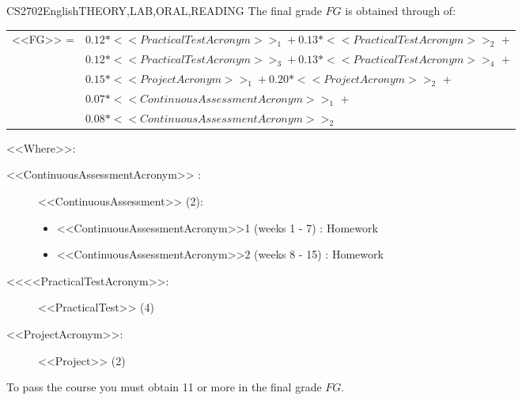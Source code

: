     
    \begin{evaluation}{CS2702}{English}{THEORY,LAB,ORAL,READING}
    The final grade $FG$ is obtained through of:
    
    \begin{tabular}{cl}
      <<FG>> = & $0.12*<<PracticalTestAcronym>>_{1} + 0.13*<<PracticalTestAcronym>>_{2}$ + \\
               & $0.12*<<PracticalTestAcronym>>_{3} + 0.13*<<PracticalTestAcronym>>_{4}$ + \\ 
               & $0.15*<<ProjectAcronym>>_{1} + 0.20*<<ProjectAcronym>>_{2}$ + \\
               & $0.07*<<ContinuousAssessmentAcronym>>_{1}$ +\\
               & $0.08*<<ContinuousAssessmentAcronym>>_{2}$
    \end{tabular}
    
    \noindent <<Where>>:
    \begin{description}
        \item[<<ContinuousAssessmentAcronym>> :] <<ContinuousAssessment>> (2):
       \begin{itemize}
               \item  <<ContinuousAssessmentAcronym>>1 (weeks 1 - 7)  : Homework 
                \item <<ContinuousAssessmentAcronym>>2 (weeks 8 - 15) : Homework
         \end{itemize}
        \item[<<<<PracticalTestAcronym>>:] <<PracticalTest>> (4)
        \item[<<ProjectAcronym>>:] <<Project>> (2)    
    \end{description}
    
    
    \noindent To pass the course you must obtain 11 or more in the final grade $FG$.
    \end{evaluation}
    
    
    
    
